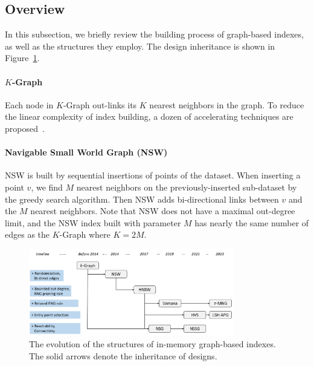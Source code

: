 \documentclass[11pt]{article}
\begin{document}
\subsection{Overview}
In this subsection, we briefly review the building process of graph-based indexes, as well as the structures they employ.
The design inheritance is shown in Figure~\ref{zeyu_fig:evo-graph}.

\paragraph{$K$-Graph~\cite{nn-descent}}
Each node in $K$-Graph out-links its $K$ nearest neighbors in the graph.
To reduce the linear complexity of index building, a dozen of accelerating techniques are proposed~\cite{nn-descent,efanna}.

\paragraph{Navigable Small World Graph (NSW)~\cite{nsw}}
NSW is built by sequential insertions of points of the dataset.
When inserting a point $v$, we find $M$ nearest neighbors on the previously-inserted sub-dataset by the greedy search algorithm.
Then NSW adds bi-directional links between $v$ and the $M$ nearest neighbors.
Note that NSW does not have a maximal out-degree limit, and the NSW index built with parameter $M$ has nearly the same number of edges as the $K$-Graph where $K=2M$.



\begin{figure}[t]
\centering
    \includegraphics[width=0.8\textwidth]{submissions/Zeyu2023/figs/evo-graph.png}
    \caption{The evolution of the structures of in-memory graph-based indexes. The solid arrows denote the inheritance of designs. }
    \label{zeyu_fig:evo-graph}
\end{figure}
\end{document}
